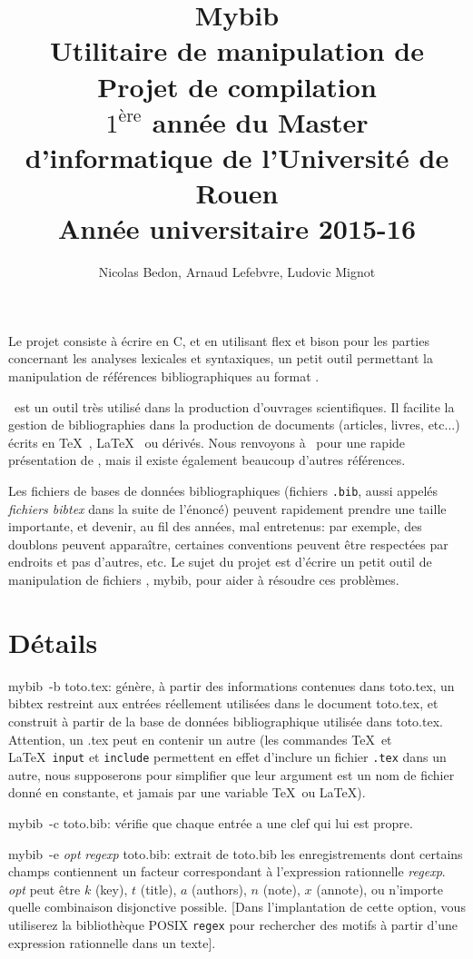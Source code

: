 \documentclass[10pt,a4wide,draft]{article}
\title{Mybib\\\normalsize Utilitaire de manipulation de \BibTeX\\\small Projet de compilation\\ $1^\text{ère}$ année du Master d'informatique de l'Université de Rouen\\ Année universitaire 2015-16}
\author{Nicolas Bedon, Arnaud Lefebvre, Ludovic Mignot}
\date{}
\newcommand{\mybib}[0]{{mybib}\xspace}
\begin{document}
\maketitle

Le projet consiste à écrire en C, et en utilisant flex et bison pour les parties concernant les analyses lexicales et syntaxiques, un petit outil permettant la manipulation de références bibliographiques au format \BibTeX.

\BibTeX\ est un outil très utilisé dans la production d'ouvrages scientifiques. Il facilite la gestion de bibliographies dans la production de documents (articles, livres, etc...) écrits en \TeX~\cite{Knuth:1986}, \LaTeX~\cite{Lamport:1994} ou dérivés. Nous renvoyons à~\cite{Fenn:2006} pour une rapide présentation de \BibTeX, mais il existe également beaucoup d'autres références.

Les fichiers de bases de données bibliographiques (fichiers \verb!.bib!, aussi appelés \emph{fichiers bibtex} dans la suite de l'énoncé) peuvent rapidement prendre une taille importante, et devenir, au fil des années, mal entretenus: par exemple, des doublons peuvent apparaître, certaines conventions peuvent être respectées par endroits et pas d'autres, etc. Le sujet du projet est d'écrire un petit outil de manipulation de fichiers \BibTeX, \mybib, pour aider à résoudre ces problèmes.

\section{Détails}

\mybib\ -b toto.tex: génère, à partir des informations contenues dans toto.tex, un bibtex restreint aux entrées réellement utilisées dans le document toto.tex, et construit à partir de la base de données bibliographique utilisée dans toto.tex. Attention, un .tex peut en contenir un autre (les commandes \TeX\ et \LaTeX\ \verb!input! et \verb!include! permettent en effet d'inclure un fichier \verb!.tex! dans un autre, nous supposerons pour simplifier que leur argument est un nom de fichier donné en constante, et jamais par une variable  \TeX\ ou \LaTeX).

\mybib\ -c toto.bib: vérifie que chaque entrée a une clef qui lui est propre.

\mybib\ -e {\it opt} {\it regexp} toto.bib: extrait de toto.bib les enregistrements dont certains champs contiennent un facteur correspondant à l'expression rationnelle {\it regexp}. {\it opt} peut être $k$ (key), $t$ (title), $a$ (authors), $n$ (note), $x$ (annote), ou n'importe quelle combinaison disjonctive possible. [Dans l'implantation de cette option, vous utiliserez la bibliothèque POSIX \verb!regex! pour rechercher des motifs à partir d'une expression rationnelle dans un texte].
 
\end{document}
